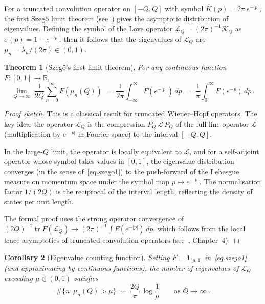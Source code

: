 \documentclass[11pt,a4paper]{article}
\newtheorem{theorem}{Theorem}[section]
\newtheorem{corollary}[theorem]{Corollary}
\theoremstyle{definition}
\begin{document}
For a truncated convolution operator on $[-Q,Q]$ with symbol
$\widehat{K}(p) = 2\pi\, e^{-|p|}$, the first Szeg\H{o} limit theorem
(see~\cite{Sakhnovich2015,bottcher2006analysis}) gives the asymptotic distribution of
eigenvalues. Defining the symbol of the Love operator
$\mathcal{L}_Q = (2\pi)^{-1}\mathcal{K}_Q$ as
$\sigma(p) = 1 - e^{-|p|}$, then it follows that the eigenvalues of $\mathcal{L}_Q$ are
$\mu_n = \lambda_n/(2\pi) \in (0,1)$.

\begin{theorem}[Szeg\H{o}'s first limit theorem]\label{thm:szego1}
  For any continuous function $F: [0,1] \to \mathbb{R}$,
  \begin{equation}\label{eq.szego1}
    \lim_{Q\to\infty}\;
    \frac{1}{2Q}
    \sum_{n=0}^{\infty} F(\mu_n(Q))
    \;=\;
    \frac{1}{2\pi}
    \int_{-\infty}^{\infty} F\left(e^{-|p|}\right)\, dp
    \;=\;
    \frac{1}{\pi}
    \int_0^{\infty} F\left(e^{-p}\right)\, dp\,.
  \end{equation}
\end{theorem}

\begin{proof}[Proof sketch]
This is a classical result for truncated Wiener--Hopf operators. The key
idea: the operator $\mathcal{L}_Q$ is the compression $P_Q\, \mathcal{L}\,
P_Q$ of the full-line operator $\mathcal{L}$ (multiplication by $e^{-|p|}$
in Fourier space) to the interval $[-Q,Q]$.

In the large-$Q$ limit, the operator is locally equivalent  to
$\mathcal{L}$, and for a self-adjoint operator whose symbol takes values in
$[0,1]$, the eigenvalue distribution converges (in the sense
of~\eqref{eq.szego1}) to the push-forward of the Lebesgue measure on
momentum space under the symbol map $p \mapsto e^{-|p|}$. The
normalisation factor $1/(2Q)$ is the reciprocal of the interval length,
reflecting the density of states per unit length.

The formal proof uses the strong operator convergence of
$(2Q)^{-1} \operatorname{tr} F(\mathcal{L}_Q) \to (2\pi)^{-1}
\int F(e^{-|p|})\, dp$, which follows from the local trace asymptotics of
truncated convolution operators (see~\cite{Sakhnovich2015}, Chapter~4).
\end{proof}

\begin{corollary}[Eigenvalue counting function]\label{cor:counting}
  Setting $F = \mathbf{1}_{(\mu,1]}$ in~\eqref{eq.szego1} (and
  approximating by continuous functions), the number of eigenvalues of
  $\mathcal{L}_Q$ exceeding $\mu \in (0,1)$ satisfies
  \begin{equation}\label{eq.counting}
    \#\{n : \mu_n(Q) > \mu\}
    \;\sim\;
    \frac{2Q}{\pi}\, \log\frac{1}{\mu}
    \qquad \text{as } Q \to \infty\,.
  \end{equation}
\end{corollary}
\end{document}
